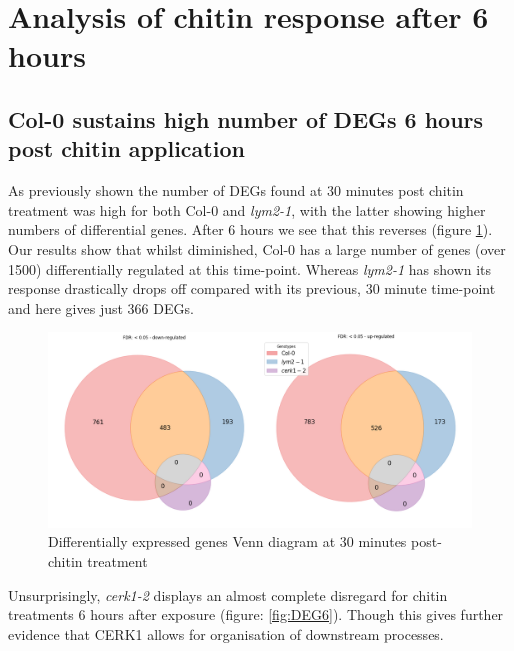 \documentclass[../main.tex]{subfiles}
\begin{document}
\clearpage

\section{Analysis of chitin response after 6 hours}

\subsection{Col-0 sustains high number of DEGs 6 hours post chitin application}
\label{sec:col-0-sustains}

As previously shown the number of DEGs found at 30 minutes post chitin treatment
was high for both Col-0 and \textit{lym2-1}, with the latter showing higher
numbers of differential genes. After 6 hours we see that this reverses (figure
\ref{fig:6hrDEGs}). Our results show that whilst diminished, Col-0 has a large
number of genes (over 1500) differentially regulated at this time-point. Whereas
\textit{lym2-1} has shown its response drastically drops off compared with its
previous, 30 minute time-point and here gives just 366 DEGs. 


\begin{figure}[ht]
  \centering
  \includegraphics[width=0.8\columnwidth]{figures/vennTreatmentschitin6.png}
  \caption{\label{fig:6hrDEGs} Differentially expressed genes Venn diagram at 30
  minutes post-chitin treatment}
\end{figure}

Unsurprisingly, \textit{cerk1-2} displays an almost complete disregard for
chitin treatments 6 hours after exposure (figure: \ref{fig:DEG6}). Though this
gives further evidence that CERK1 allows for organisation of downstream
processes. 
\end{document}
